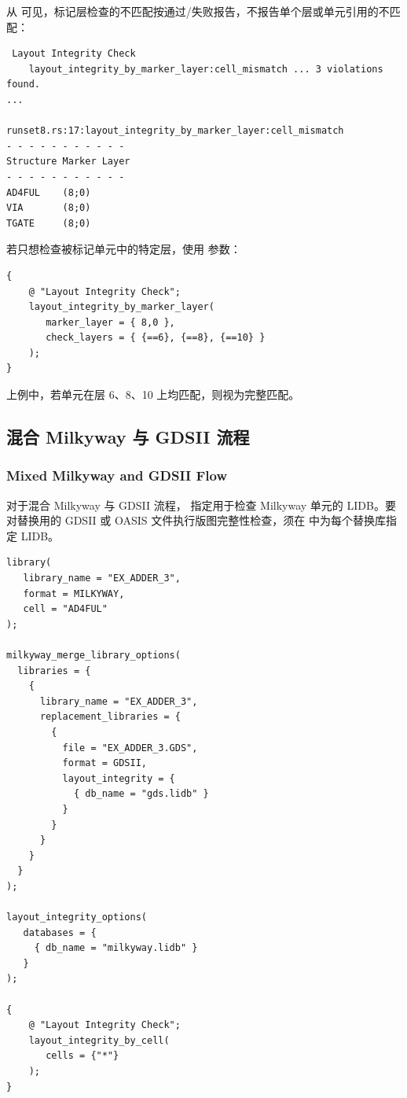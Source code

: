 从  可见，标记层检查的不匹配按通过/失败报告，不报告单个层或单元引用的不匹配：

\begin{lstlisting}
 Layout Integrity Check
    layout_integrity_by_marker_layer:cell_mismatch ... 3 violations found.
...

runset8.rs:17:layout_integrity_by_marker_layer:cell_mismatch
- - - - - - - - - - -
Structure Marker Layer
- - - - - - - - - - -
AD4FUL    (8;0)
VIA       (8;0)
TGATE     (8;0)
\end{lstlisting}

若只想检查被标记单元中的特定层，使用  参数：

\begin{lstlisting}[style=pxl]
{
    @ "Layout Integrity Check";
    layout_integrity_by_marker_layer(
       marker_layer = { 8,0 },
       check_layers = { {==6}, {==8}, {==10} }
    );
}
\end{lstlisting}

上例中，若单元在层 6、8、10 上均匹配，则视为完整匹配。

\subsection{混合 Milkyway 与 GDSII 流程}
\subsubsection*{Mixed Milkyway and GDSII Flow}

对于混合 Milkyway 与 GDSII 流程， 指定用于检查 Milkyway 单元的 LIDB。要对替换用的 GDSII 或 OASIS 文件执行版图完整性检查，须在  中为每个替换库指定 LIDB。

\begin{lstlisting}[style=pxl]
library(
   library_name = "EX_ADDER_3",
   format = MILKYWAY,
   cell = "AD4FUL"
);

milkyway_merge_library_options(
  libraries = {
    {
      library_name = "EX_ADDER_3",
      replacement_libraries = {
        {
          file = "EX_ADDER_3.GDS",
          format = GDSII,
          layout_integrity = {
            { db_name = "gds.lidb" }
          }
        }
      }
    }
  }
);

layout_integrity_options(
   databases = {
     { db_name = "milkyway.lidb" }
   }
);

{
    @ "Layout Integrity Check";
    layout_integrity_by_cell(
       cells = {"*"}
    );
}
\end{lstlisting}

